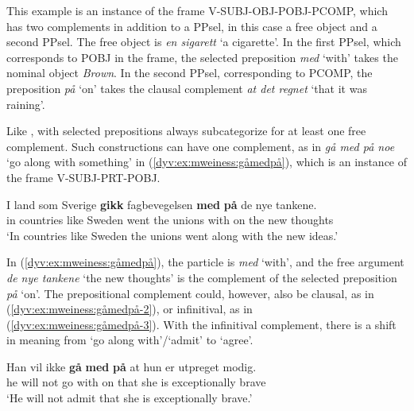 \documentclass[output=paper]{langsci/langscibook}
\begin{document}
This example is an instance of the frame V-SUBJ-OBJ-POBJ-PCOMP, which has two complements in addition to a PPsel, in this case a free object and a second PPsel.
The free object is \emph{en sigarett} `a cigarette'.
In the first PPsel, which corresponds to POBJ in the  frame, the selected preposition \emph{med} `with' takes the nominal object \emph{Brown}. 
In the second PPsel, corresponding to PCOMP,  the preposition \emph{på} `on' takes the clausal complement \emph{at det regnet} `that it was raining'.

Like ,  with selected prepositions always subcategorize for at least one free complement. 
Such constructions can have one complement, as in \emph{gå med på noe} `go along with something' in (\ref{dyv:ex:mweiness:gåmedpå}), which is an instance of the frame V-SUBJ-PRT-POBJ.
 
\ea\label{dyv:ex:mweiness:gåmedpå}
\gll   I land som Sverige \textbf{gikk} fagbevegelsen \textbf{med} \textbf{på} de nye tankene. \\
        in countries like Sweden went {the unions} with on the new thoughts \\
\glt `In countries like Sweden the unions went along with the new ideas.' \\
\z

In (\ref{dyv:ex:mweiness:gåmedpå}), the particle is \emph{med} `with', and the free argument  \emph{de nye tankene} `the new thoughts' is the complement of the selected preposition \emph{på} `on'.  
The prepositional complement could, however, also be clausal, as in (\ref{dyv:ex:mweiness:gåmedpå-2}), or infinitival, as in (\ref{dyv:ex:mweiness:gåmedpå-3}).
With the infinitival complement, there is a shift in meaning from `go along with'/`admit' to `agree'. 

\ea\label{dyv:ex:mweiness:gåmedpå-2}
\gll   Han vil ikke \textbf{gå} \textbf{med} \textbf{på} at hun er utpreget modig. \\
        he will not go with on that she is exceptionally brave \\
\glt `He will not admit that she is exceptionally brave.' \\
\z
\end{document}
